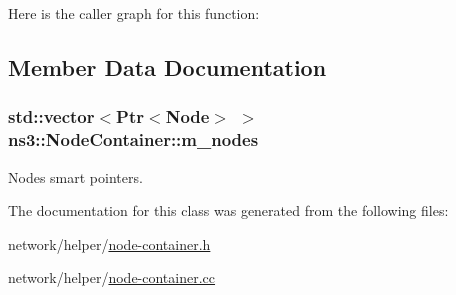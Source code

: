 Here is the caller graph for this function\+:




\subsection{Member Data Documentation}
\subsubsection[{\texorpdfstring{m\+\_\+nodes}{m_nodes}}]{\setlength{\rightskip}{0pt plus 5cm}std\+::vector$<${\bf Ptr}$<${\bf Node}$>$ $>$ ns3\+::\+Node\+Container\+::m\+\_\+nodes\hspace{0.3cm}{\ttfamily [private]}}\hypertarget{classns3_1_1NodeContainer_a1abd27b43170c03dbbb58785cdc9c17d}{}\label{classns3_1_1NodeContainer_a1abd27b43170c03dbbb58785cdc9c17d}


Nodes smart pointers. 



The documentation for this class was generated from the following files\+:\begin{DoxyCompactItemize}
\item 
network/helper/\hyperlink{node-container_8h}{node-\/container.\+h}\item 
network/helper/\hyperlink{node-container_8cc}{node-\/container.\+cc}\end{DoxyCompactItemize}
